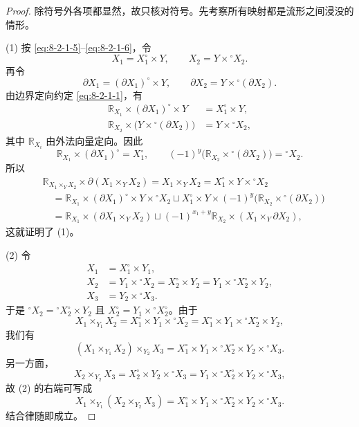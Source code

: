 \begin{proof}
除符号外各项都显然，故只核对符号。先考察所有映射都是流形之间浸没的
情形。

\textup{(1)} 按 \eqref{eq:8-2-1-5}--\eqref{eq:8-2-1-6}，令
\[
 X_1=X_1^\circ\times Y,
 \qquad X_2=Y\times{}^\circ X_2.
\]
再令
\[
 \partial X_1=(\partial X_1)^\circ\times Y,
 \qquad \partial X_2=Y\times{}^\circ(\partial X_2).
\]
由边界定向约定 \eqref{eq:8-2-1-1}，有
\[
\begin{aligned}
 \mathbb R_{X_1}\times(\partial X_1)^\circ\times Y
 &=X_1^\circ\times Y,\\
 \mathbb R_{X_2}\times\bigl(Y\times{}^\circ(\partial X_2)\bigr)
 &=Y\times{}^\circ X_2,
\end{aligned}
\]
其中 $\mathbb R_{X_i}$ 由外法向量定向。因此
\[
 \mathbb R_{X_1}\times(\partial X_1)^\circ=X_1^\circ,
 \qquad
 (-1)^y\bigl(\mathbb R_{X_2}\times{}^\circ(\partial X_2)\bigr)
 ={}^\circ X_2.
\]
所以
\[
\begin{aligned}
 &\mathbb R_{X_1\times_YX_2}\times\partial(X_1\times_YX_2)
 =X_1\times_YX_2=X_1^\circ\times Y\times{}^\circ X_2\\
 &\quad=
 \mathbb R_{X_1}\times(\partial X_1)^\circ\times Y\times{}^\circ X_2
 \mathbin{\sqcup}
 X_1^\circ\times Y\times
 (-1)^y\bigl(\mathbb R_{X_2}\times{}^\circ(\partial X_2)\bigr)\\
 &\quad=
 \mathbb R_{X_1}\times(\partial X_1\times_YX_2)
 \mathbin{\sqcup}
 (-1)^{x_1+y}\mathbb R_{X_2}
 \times(X_1\times_Y\partial X_2),
\end{aligned}
\]
这就证明了 (1)。

\textup{(2)} 令
\[
\begin{aligned}
 X_1&=X_1^\circ\times Y_1,\\
 X_2&=Y_1\times{}^\circ X_2
     =X_2^\circ\times Y_2
     =Y_1\times{}^\circ X_2^\circ\times Y_2,\\
 X_3&=Y_2\times{}^\circ X_3.
\end{aligned}
\]
于是 ${}^\circ X_2={}^\circ X_2^\circ\times Y_2$ 且
$X_2^\circ=Y_1\times{}^\circ X_2^\circ$。由于
\[
 X_1\times_{Y_1}X_2
 =X_1^\circ\times Y_1\times{}^\circ X_2
 =X_1^\circ\times Y_1\times{}^\circ X_2^\circ\times Y_2,
\]
我们有
\[
 (X_1\times_{Y_1}X_2)\times_{Y_2}X_3
 =X_1^\circ\times Y_1\times{}^\circ X_2^\circ
  \times Y_2\times{}^\circ X_3.
\]
另一方面，
\[
 X_2\times_{Y_2}X_3
 =X_2^\circ\times Y_2\times{}^\circ X_3
 =Y_1\times{}^\circ X_2^\circ\times Y_2\times{}^\circ X_3,
\]
故 (2) 的右端可写成
\[
 X_1\times_{Y_1}(X_2\times_{Y_2}X_3)
 =X_1^\circ\times Y_1\times{}^\circ X_2^\circ
  \times Y_2\times{}^\circ X_3.
\]
结合律随即成立。


\end{proof}
